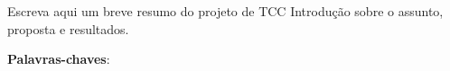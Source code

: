 \begin{resumo}

Escreva aqui um breve resumo do projeto de TCC {Introdução sobre o assunto, proposta e resultados}.

\vspace{\onelineskip}
\noindent
\textbf{Palavras-chaves}:
\end{resumo}




